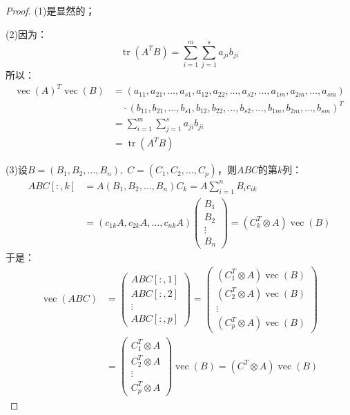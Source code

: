 \begin{proof}
	(1)是显然的；\par
	(2)因为：
	\begin{equation*}
		\operatorname{tr}(A^TB)=\sum_{i=1}^{m}\sum_{j=1}^{s}a_{ji}b_{ji}
	\end{equation*}
	所以：
	\begin{align*}
		\operatorname{vec}(A)^T\operatorname{vec}(B)
		&=(a_{11},a_{21},\dots,a_{s1},a_{12},a_{22},\dots,a_{s2},\dots,a_{1m},a_{2m},\dots,a_{sm}) \\
		&\quad\cdot(b_{11},b_{21},\dots,b_{s1},b_{12},b_{22},\dots,b_{s2},\dots,b_{1m},b_{2m},\dots,b_{sm})^T \\
		&=\sum_{i=1}^{m}\sum_{j=1}^{s}a_{ji}b_{ji} \\
		&=\operatorname{tr}(A^TB)
	\end{align*}\par
	(3)设$B=(B_1,B_2,\dots,B_n),\;C=(C_1,C_2,\dots,C_p)$，则$ABC$的第$k$列：
	\begin{align*}
		ABC[:,k]
		&=A(B_1,B_2,\dots,B_n)C_k
		=A\sum_{i=1}^{n}B_ic_{ik} \\
		&=(c_{1k}A,c_{2k}A,\dots,c_{nk}A)
		\begin{pmatrix}
			B_1 \\
			B_2 \\
			\vdots \\
			B_n
		\end{pmatrix}
		=(C_k^T\otimes A)\operatorname{vec}(B)
	\end{align*}
	于是：
	\begin{align*}
		\operatorname{vec}(ABC)
		&=
		\begin{pmatrix}
			ABC[:,1] \\
			ABC[:,2] \\
			\vdots \\
			ABC[:,p]
		\end{pmatrix}
		=
		\begin{pmatrix}
			(C_1^T\otimes A)\operatorname{vec}(B) \\
			(C_2^T\otimes A)\operatorname{vec}(B) \\
			\vdots \\
			(C_p^T\otimes A)\operatorname{vec}(B)
		\end{pmatrix} \\
		&=
		\begin{pmatrix}
			C_1^T\otimes A \\
			C_2^T\otimes A \\
			\vdots \\
			C_p^T\otimes A
		\end{pmatrix}
		\operatorname{vec}(B)
		=(C^T\otimes A)\operatorname{vec}(B)
	\end{align*}
\end{proof}

